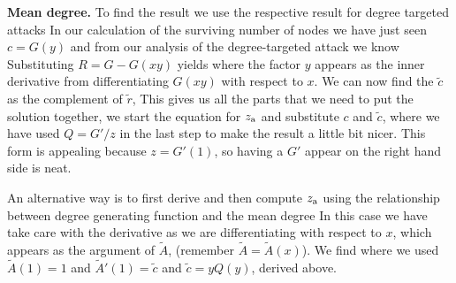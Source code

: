 {\bf Mean degree.} To find the result we use the respective result for degree targeted attacks 
In our calculation of the surviving number of nodes we have just seen $c=G(y)$ and from our analysis of the degree-targeted attack we know
Substituting $R=G-G(xy)$ yields
where the factor $y$ appears as the inner derivative from differentiating $G(xy)$ with respect to $x$. We can now find the $\tilde{c}$ as the complement of $\tilde{r}$,
This gives us all the parts that we need to put the solution together, we start the equation for $z_{\rm a}$ and substitute $c$ and $\tilde{c}$, 
where we have used $Q=G'/z$ in the last step to make the result a little bit nicer. This form is appealing because $z=G'(1)$, so having a $G'$ appear on the right hand side is neat. 

An alternative way is to first derive
and then compute $z_{\rm a}$ using the relationship between degree generating function and the mean degree 
In this case we have take care with the derivative as we are differentiating with respect to $x$, which appears as the argument of $\tilde{A}$, (remember $\tilde{A}=\tilde{A}(x)$). We find
where we used $\tilde{A}(1)=1$ and $\tilde{A}'(1)=\tilde{c}$ and $\tilde{c}=yQ(y)$, derived above.

